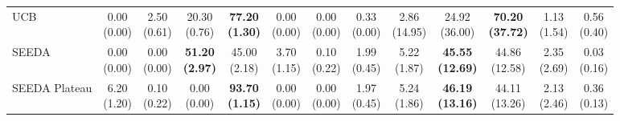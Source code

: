 \begin{table}[H]
{\begin{tabular}{l|cccccc|cccccc}
UCB & \makecell{0.00 \\ (0.00)} & \makecell{2.50 \\ (0.61)} & {\cellcolor[HTML]{C8E6C9}} \makecell{20.30 \\ (0.76)} & \bfseries \makecell{77.20 \\ (1.30)} & \makecell{0.00 \\ (0.00)} & \makecell{0.00 \\ (0.00)} & \makecell{0.33 \\ (0.00)} & \makecell{2.86 \\ (14.95)} & {\cellcolor[HTML]{C8E6C9}} \makecell{24.92 \\ (36.00)} & \bfseries \makecell{70.20 \\ (37.72)} & \makecell{1.13 \\ (1.54)} & \makecell{0.56 \\ (0.40)} \\
SEEDA & \makecell{0.00 \\ (0.00)} & \makecell{0.00 \\ (0.00)} & {\cellcolor[HTML]{C8E6C9}} \bfseries \makecell{51.20 \\ (2.97)} & \makecell{45.00 \\ (2.18)} & \makecell{3.70 \\ (1.15)} & \makecell{0.10 \\ (0.22)} & \makecell{1.99 \\ (0.45)} & \makecell{5.22 \\ (1.87)} & {\cellcolor[HTML]{C8E6C9}} \bfseries \makecell{45.55 \\ (12.69)} & \makecell{44.86 \\ (12.58)} & \makecell{2.35 \\ (2.69)} & \makecell{0.03 \\ (0.16)} \\
SEEDA Plateau & \makecell{6.20 \\ (1.20)} & \makecell{0.10 \\ (0.22)} & {\cellcolor[HTML]{C8E6C9}} \makecell{0.00 \\ (0.00)} & \bfseries \makecell{93.70 \\ (1.15)} & \makecell{0.00 \\ (0.00)} & \makecell{0.00 \\ (0.00)} & \makecell{1.97 \\ (0.45)} & \makecell{5.24 \\ (1.86)} & {\cellcolor[HTML]{C8E6C9}} \bfseries \makecell{46.19 \\ (13.16)} & \makecell{44.11 \\ (13.26)} & \makecell{2.13 \\ (2.46)} & \makecell{0.36 \\ (0.13)} \\
\bottomrule
\end{tabular}
}%
\end{table}
